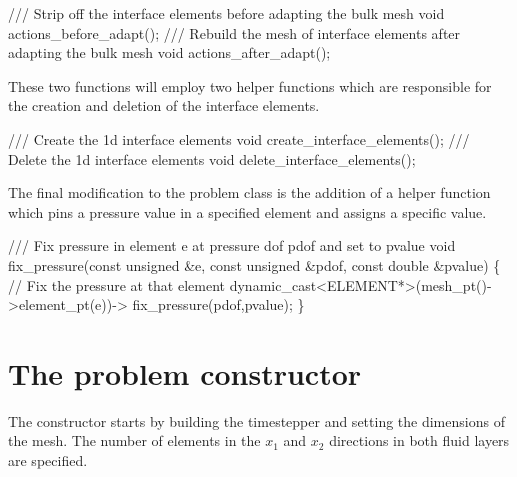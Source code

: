 \begin{DoxyCodeInclude}
 \textcolor{comment}{/// Strip off the interface elements before adapting the bulk mesh}
 \textcolor{keywordtype}{void} actions\_before\_adapt();
\textcolor{comment}{}
\textcolor{comment}{ /// Rebuild the mesh of interface elements after adapting the bulk mesh}
\textcolor{comment}{} \textcolor{keywordtype}{void} actions\_after\_adapt();

\end{DoxyCodeInclude}


These two functions will employ two helper functions which are responsible for the creation and deletion of the interface elements.


\begin{DoxyCodeInclude}
 \textcolor{comment}{/// Create the 1d interface elements}
 \textcolor{keywordtype}{void} create\_interface\_elements();
\textcolor{comment}{}
\textcolor{comment}{ /// Delete the 1d interface elements}
\textcolor{comment}{} \textcolor{keywordtype}{void} delete\_interface\_elements();

\end{DoxyCodeInclude}


The final modification to the problem class is the addition of a helper function which pins a pressure value in a specified element and assigns a specific value.


\begin{DoxyCodeInclude}
 \textcolor{comment}{/// Fix pressure in element e at pressure dof pdof and set to pvalue}
 \textcolor{keywordtype}{void} fix\_pressure(\textcolor{keyword}{const} \textcolor{keywordtype}{unsigned} &e,
                   \textcolor{keyword}{const} \textcolor{keywordtype}{unsigned} &pdof, 
                   \textcolor{keyword}{const} \textcolor{keywordtype}{double} &pvalue)
  \{
   \textcolor{comment}{// Fix the pressure at that element}
   \textcolor{keyword}{dynamic\_cast<}ELEMENT*\textcolor{keyword}{>}(mesh\_pt()->element\_pt(e))->
                          fix\_pressure(pdof,pvalue);
  \}

\end{DoxyCodeInclude}




 

\hypertarget{index_constructor}{}\section{The problem constructor}\label{index_constructor}
The constructor starts by building the timestepper and setting the dimensions of the mesh. The number of elements in the $ x_1 $ and $ x_2 $ directions in both fluid layers are specified.


